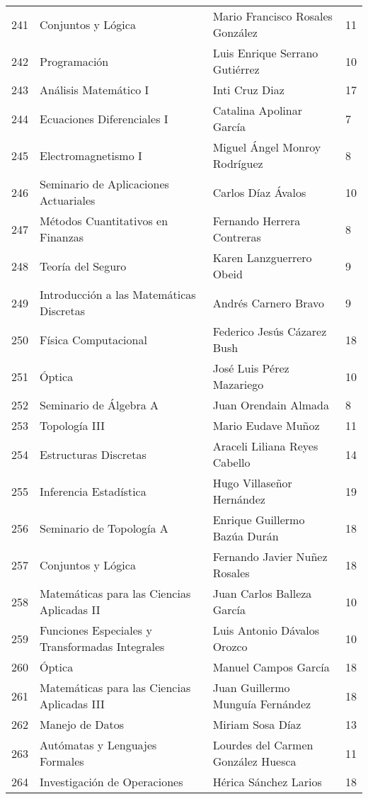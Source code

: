 \begin{table}[ht]
\begin{tabular}{rlll}
  241 & Conjuntos y Lógica & Mario Francisco Rosales González & 11 \\ 
  242 & Programación & Luis Enrique Serrano Gutiérrez & 10 \\ 
  243 & Análisis Matemático I & Inti Cruz Diaz & 17 \\ 
  244 & Ecuaciones Diferenciales I & Catalina Apolinar García & 7 \\ 
  245 & Electromagnetismo I & Miguel Ángel Monroy Rodríguez & 8 \\ 
  246 & Seminario de Aplicaciones Actuariales & Carlos Díaz Ávalos & 10 \\ 
  247 & Métodos Cuantitativos en Finanzas & Fernando Herrera Contreras & 8 \\ 
  248 & Teoría del Seguro & Karen Lanzguerrero Obeid & 9 \\ 
  249 & Introducción a las Matemáticas Discretas & Andrés Carnero Bravo & 9 \\ 
  250 & Física Computacional & Federico Jesús Cázarez Bush & 18 \\ 
  251 & Óptica & José Luis Pérez Mazariego & 10 \\ 
  252 & Seminario de Álgebra A & Juan Orendain Almada & 8 \\ 
  253 & Topología III & Mario Eudave Muñoz & 11 \\ 
  254 & Estructuras Discretas & Araceli Liliana Reyes Cabello & 14 \\ 
  255 & Inferencia Estadística & Hugo Villaseñor Hernández & 19 \\ 
  256 & Seminario de Topología A & Enrique Guillermo Bazúa Durán & 18 \\ 
  257 & Conjuntos y Lógica & Fernando Javier Nuñez Rosales & 18 \\ 
  258 & Matemáticas para las Ciencias Aplicadas II & Juan Carlos Balleza García & 10 \\ 
  259 & Funciones Especiales y Transformadas Integrales & Luis Antonio Dávalos Orozco & 10 \\ 
  260 & Óptica & Manuel Campos García & 18 \\ 
  261 & Matemáticas para las Ciencias Aplicadas III & Juan Guillermo Munguía Fernández & 18 \\ 
  262 & Manejo de Datos & Miriam Sosa Díaz & 13 \\ 
  263 & Autómatas y Lenguajes Formales & Lourdes del Carmen González Huesca & 11 \\ 
  264 & Investigación de Operaciones & Hérica Sánchez Larios & 18 \\ 

\end{tabular}
\end{table}
